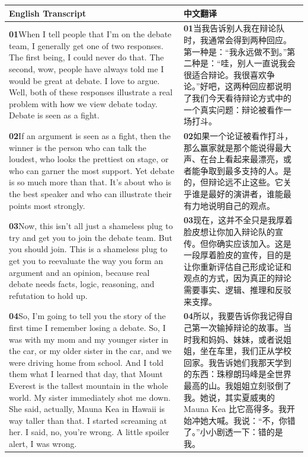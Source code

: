 \documentclass[UTF8,zihao=-4,fontset=fandol]{ctexart}
\newcommand{\TranscriptColumn}{\raggedright\arraybackslash\hyphenpenalty=10000\exhyphenpenalty=10000\sloppy}
\begin{document}
\renewcommand{\arraystretch}{1.23}
\begin{longtable}{>{\TranscriptColumn}p{} >{\TranscriptColumn}p{}}
\rowcolor{headerBg}\textbf{English Transcript} & \textbf{中文翻译} \\ \hline
\textbf{01}\quad When I tell people that I'm on the debate team, I generally get one of two responses. The first being, I could never do that. The second, wow, people have always told me I would be great at debate. I love to argue. Well, both of these responses illustrate a real problem with how we view debate today. Debate is seen as a fight. & \textbf{01}\quad 当我告诉别人我在辩论队时，我通常会得到两种回应。第一种是：“我永远做不到。”第二种是：“哇，别人一直说我会很适合辩论。我很喜欢争论。”好吧，这两种回应都说明了我们今天看待辩论方式中的一个真实问题：辩论被看作一场打斗。 \\ \hline
\textbf{02}\quad If an argument is seen as a fight, then the winner is the person who can talk the loudest, who looks the prettiest on stage, or who can garner the most support. Yet debate is so much more than that. It's about who is the best speaker and who can illustrate their points most strongly. & \textbf{02}\quad 如果一个论证被看作打斗，那么赢家就是那个能说得最大声、在台上看起来最漂亮，或者能争取到最多支持的人。是的，但辩论远不止这些。它关乎谁是最好的演讲者，谁能最有力地说明自己的观点。 \\ \hline
\textbf{03}\quad Now, this isn't all just a shameless plug to try and get you to join the debate team. But you should join. This is a shameless plug to get you to reevaluate the way you form an argument and an opinion, because real debate needs facts, logic, reasoning, and refutation to hold up. & \textbf{03}\quad 现在，这并不全只是我厚着脸皮想让你加入辩论队的宣传。但你确实应该加入。这是一段厚着脸皮的宣传，目的是让你重新评估自己形成论证和观点的方式，因为真正的辩论需要事实、逻辑、推理和反驳来支撑。 \\ \hline
\textbf{04}\quad So, I'm going to tell you the story of the first time I remember losing a debate. So, I was with my mom and my younger sister in the car, or my older sister in the car, and we were driving home from school. And I told them what I learned that day, that Mount Everest is the tallest mountain in the whole world. My sister immediately shot me down. She said, actually, Mauna Kea in Hawaii is way taller than that. I started screaming at her. I said, no, you're wrong. A little spoiler alert, I was wrong. & \textbf{04}\quad 所以，我要告诉你我记得自己第一次输掉辩论的故事。当时我和妈妈、妹妹，或者说姐姐，坐在车里，我们正从学校回家。我告诉她们我那天学到的东西：珠穆朗玛峰是全世界最高的山。我姐姐立刻驳倒了我。她说，其实夏威夷的 Mauna Kea 比它高得多。我开始冲她大喊。我说：“不，你错了。”小小剧透一下：错的是我。 \\ \hline

\end{longtable}
\end{document}
